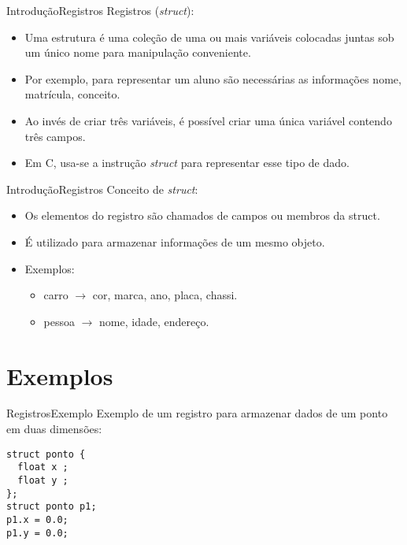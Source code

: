 \documentclass[aspectratio=169]{beamer}
\begin{document}

\begin{frame}{Introdução}{Registros}
Registros ({\it struct}):
\begin{itemize}
\item Uma estrutura é uma coleção de uma ou mais variáveis colocadas juntas sob um único nome para manipulação conveniente. 
\item Por exemplo, para representar um aluno são necessárias as informações nome, matrícula, conceito. 
\item Ao invés de criar três variáveis, é possível criar uma única variável contendo três campos. 
\item Em C, usa-se a instrução {\it struct} para representar esse tipo de dado.
\end{itemize}
\end{frame}


\begin{frame}{Introdução}{Registros}
Conceito de {\it struct}:
\begin{itemize}
\item Os elementos do registro são chamados de campos ou membros da struct.
\item É utilizado para armazenar informações de um mesmo objeto.
\item Exemplos: 
\begin{itemize}
\item carro $\rightarrow$ cor, marca, ano, placa, chassi.
\item pessoa $\rightarrow$ nome, idade, endereço.
\end{itemize}
\end{itemize}
\end{frame}

\section{Exemplos}

\begin{frame}[fragile]{Registros}{Exemplo}
Exemplo de um registro para armazenar dados de um ponto em duas dimensões:
\begin{lstlisting}
struct ponto {
  float x ;
  float y ;
};
struct ponto p1;
p1.x = 0.0;
p1.y = 0.0;
\end{lstlisting} 
\end{frame}
\end{document}
